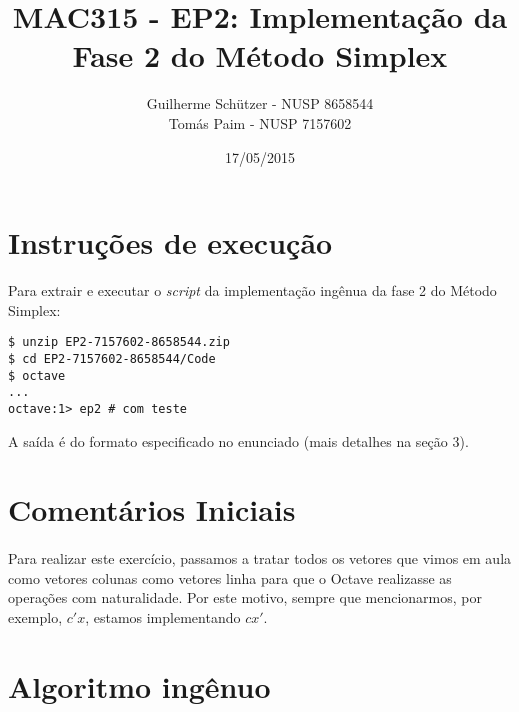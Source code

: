 \documentclass[a4paper]{article}
\title{MAC315 - EP2: Implementação da Fase 2 do Método Simplex}
\author{
	Guilherme Schützer - NUSP 8658544 \\
	Tomás Paim         - NUSP 7157602
}
\date{17/05/2015}
\begin{document}
\maketitle

\section{Instruções de execução}

Para extrair e executar o \emph{script} da implementação ingênua da fase 2 do Método Simplex:

\begin{verbatim}
$ unzip EP2-7157602-8658544.zip
$ cd EP2-7157602-8658544/Code
$ octave
...
octave:1> ep2 # com teste

\end{verbatim}

A saída é do formato especificado no enunciado (mais detalhes na seção 3).

\section{Comentários Iniciais}

\paragraph{}
Para realizar este exercício, passamos a tratar todos os vetores que vimos em aula como vetores colunas como vetores linha para que o Octave realizasse as operações com naturalidade. Por este motivo, sempre que mencionarmos, por exemplo, $c'x$, estamos implementando $cx'$.

\section{Algoritmo ingênuo}
\end{document}

